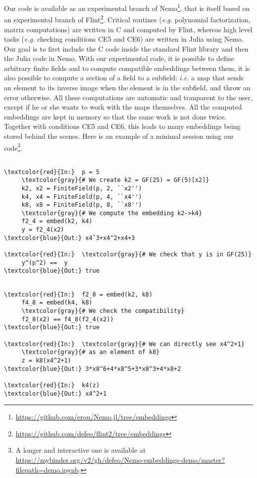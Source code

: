 \documentclass[12pt]{article}
\newcommand{\eg}{\emph{e.g. }}
\newcommand{\ie}{\emph{i.e. }}
\begin{document}
Our code is available as an experimental branch of
Nemo\footnote{\url{https://github.com/erou/Nemo.jl/tree/embeddings}}, that is
itself based on an experimental branch of
Flint\footnote{\url{https://github.com/defeo/flint2/tree/embeddings}}. Critical
routines (\eg polynomial factorization, matrix computations) are written in C and
computed by Flint, whereas high level tasks (\eg checking conditions CE5 and CE6) are
written in Julia using Nemo. Our goal is to first include the C code inside the
standard Flint library and then the Julia code in Nemo.
With our experimental code, it is possible to define arbitrary finite fields and
to compute compatible embeddings between them, it is also possible to compute a
section of a
field to a subfield: \ie a map that sends an element to its inverse image when
the element is in the subfield, and throw an error otherwise. All these
computations are automatic and tranparent to the user, except if he or she wants
to work with the maps themselves. All the computed embeddings are kept in
memory so that the same work is not done twice. Together with conditions CE5 and
CE6, this leads to many embeddings being stored behind the scenes. Here is an
example of a minimal session using our code\footnote{A longer and
  interactive one is available at
  \url{https://mybinder.org/v2/gh/defeo/Nemo-embeddings-demo/master?filepath=demo.ipynb}.}.

\begin{minipage}{0.45\textwidth}
  \begin{Verbatim}[commandchars=\\\{\}]

\textcolor{red}{In:}  p = 5
     \textcolor{gray}{# We create k2 = GF(25) = GF(5)[x2]}
     k2, x2 = FiniteField(p, 2, ``x2'')
     k4, x4 = FiniteField(p, 4, ``x4'')
     k8, x8 = FiniteField(p, 8, ``x8'')
     \textcolor{gray}{# We compute the embedding k2->k4}
     f2_4 = embed(k2, k4)
     y = f2_4(x2)
\textcolor{blue}{Out:} x4ˆ3+x4^2+x4+3 

\textcolor{red}{In:}  \textcolor{gray}{# We check that y is in GF(25)} 
     y^(p^2) ==  y
\textcolor{blue}{Out:} true 
  \end{Verbatim}
\end{minipage}
\hfill
\begin{minipage}{0.45\textwidth}
  \begin{Verbatim}[commandchars=\\\{\}]

\textcolor{red}{In:}  f2_8 = embed(k2, k8)
     f4_8 = embed(k4, k8)
     \textcolor{gray}{# We check the compatibility}
     f2_8(x2) == f4_8(f2_4(x2))
\textcolor{blue}{Out:} true

\textcolor{red}{In:}  \textcolor{gray}{# We can directly see x4^2+1} 
     \textcolor{gray}{# as an element of k8} 
     z = k8(x4^2+1)
\textcolor{blue}{Out:} 3*x8^6+4*x8^5+3*x8^3+4*x8+2

\textcolor{red}{In:}  k4(z)
\textcolor{blue}{Out:} x4^2+1
  \end{Verbatim}
\end{minipage}
\end{document}
